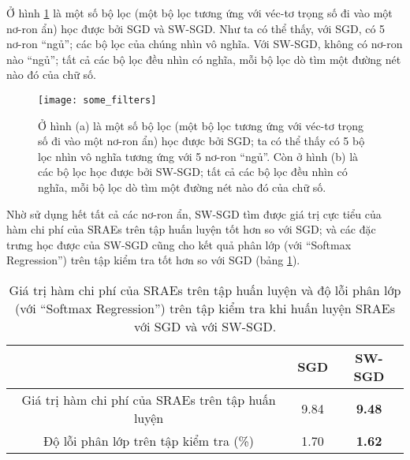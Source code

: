 Ở hình \ref{fig_filters} là một số bộ lọc (một bộ lọc tương ứng với véc-tơ trọng số đi vào một nơ-ron ẩn) học được bởi SGD và SW-SGD. Như ta có thể thấy, với SGD, có 5 nơ-ron ``ngủ''; các bộ lọc của chúng nhìn vô nghĩa. Với SW-SGD, không có nơ-ron nào ``ngủ''; tất cả các bộ lọc đều nhìn có nghĩa, mỗi bộ lọc dò tìm một đường nét nào đó của chữ số.
\begin{figure}
	\centering
	\texttt{[image: some\_filters]}
	\caption[So sánh giữa các bộ lọc học được bởi SGD với SW-SGD]{Ở hình (a) là một số bộ lọc (một bộ lọc tương ứng với véc-tơ trọng số đi vào một nơ-ron ẩn) học được bởi SGD; ta có thể thấy có 5 bộ lọc nhìn vô nghĩa tương ứng với 5 nơ-ron ``ngủ''. Còn ở hình (b) là các bộ lọc học được bởi SW-SGD; tất cả các bộ lọc đều nhìn có nghĩa, mỗi bộ lọc dò tìm một đường nét nào đó của chữ số.}
	\label{fig_filters}
\end{figure}

Nhờ sử dụng hết tất cả các nơ-ron ẩn, SW-SGD tìm được giá trị cực tiểu của hàm chi phí của SRAEs trên tập huấn luyện tốt hơn so với SGD; và các đặc trưng học được của SW-SGD cũng cho kết quả phân lớp (với ``Softmax Regression'') trên tập kiểm tra tốt hơn so với SGD (bảng \ref{table_SGDvsSW-SGD}).

\begin{table}
	\centering
	\caption[So sánh giữa SGD với SW-SGD]{Giá trị hàm chi phí của SRAEs trên tập huấn luyện và độ lỗi phân lớp (với ``Softmax Regression'') trên tập kiểm tra khi huấn luyện SRAEs với SGD và với SW-SGD.}
	\label{table_SGDvsSW-SGD}
	\begin{tabular}{|c|c|c|} \hline
	 & SGD & SW-SGD\\ \hline
	Giá trị hàm chi phí của SRAEs trên tập huấn luyện & 9.84 & \textbf{9.48}\\ \hline 
	Độ lỗi phân lớp trên tập kiểm tra (\%) & 1.70 & \textbf{1.62}\\ \hline
	\end{tabular}
\end{table}

